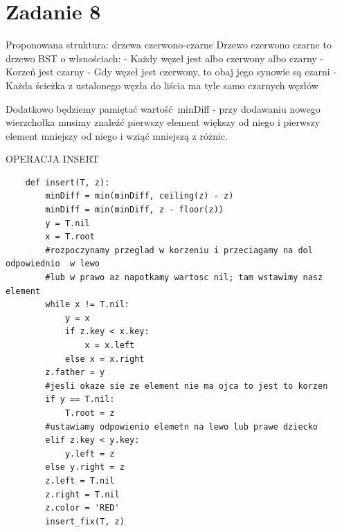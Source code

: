 \documentclass[12pt]{article}
\begin{document}
\section{Zadanie 8}


Proponowana struktura: drzewa czerwono-czarne
Drzewo czerwono czarne to drzewo BST o włsnościach:
- Każdy węzeł jest albo czerwony albo czarny
- Korzeń jest czarny
- Gdy węzeł jest czerwony, to obaj jego synowie są czarni
- Każda ścieżka z ustalonego węzła do liścia ma tyle samo czarnych węzłów

Dodatkowo będziemy pamiętać wartość minDiff - przy dodawaniu nowego wierzchołka musimy znaleźć pierwszy element większy od niego i pierwszy element mniejszy od niego i wziąć mniejszą z różnic.

OPERACJA INSERT 
\begin{lstlisting}
    def insert(T, z):
        minDiff = min(minDiff, ceiling(z) - z)
        minDiff = min(minDiff, z - floor(z)) 
        y = T.nil
        x = T.root
        #rozpoczynamy przeglad w korzeniu i przeciagamy na dol odpowiednio  w lewo 
        #lub w prawo az napotkamy wartosc nil; tam wstawimy nasz element
        while x != T.nil: 
            y = x
            if z.key < x.key:
                x = x.left
            else x = x.right
        z.father = y
        #jesli okaze sie ze element nie ma ojca to jest to korzen
        if y == T.nil:
            T.root = z
        #ustawiamy odpowienio elemetn na lewo lub prawe dziecko
        elif z.key < y.key:
            y.left = z
        else y.right = z
        z.left = T.nil
        z.right = T.nil
        z.color = 'RED'
        insert_fix(T, z)
\end{lstlisting}
\end{document}
